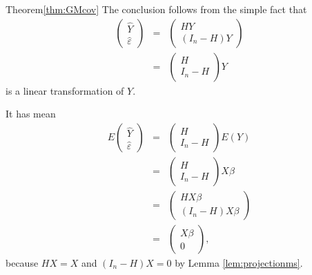\begin{myproof}{Theorem}{\ref{thm:GMcov}}
The conclusion follows from the simple fact that 
\begin{eqnarray*}
\left(\begin{array}{c}
\hat{Y}\\
\hat{\varepsilon}
\end{array}\right) 
&=& 
\left(\begin{array}{c}
HY\\
(I_{n}-H)Y
\end{array}\right) \\
&=&
\left(\begin{array}{c}
H\\
I_{n}-H
\end{array}\right)Y
\end{eqnarray*}
 is a linear transformation of $Y$. 
 
 
 It has mean
\begin{eqnarray*}
E\left(\begin{array}{c}
\hat{Y}\\
\hat{\varepsilon}
\end{array}\right)
&=& \left(\begin{array}{c}
H\\
I_{n}-H
\end{array}\right)E(Y) \\
&=&\left(\begin{array}{c}
H\\
I_{n}-H
\end{array}\right)X\beta \\
&=&\left(\begin{array}{c}
HX\beta\\
\left(I_{n}-H\right)X\beta
\end{array}\right) \\
&=&\left(\begin{array}{c}
X\beta\\
0
\end{array}\right),
\end{eqnarray*}
because $HX=X$ and $(I_n-H)X=0$ by Lemma \ref{lem:projectionms}.



\end{myproof}
